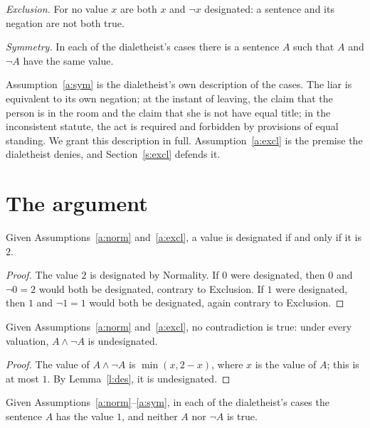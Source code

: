 \documentclass{situationist-preprint}
\begin{document}
\begin{assumption}\label{a:excl}
\emph{Exclusion.} For no value $x$ are both $x$ and $\neg x$ designated: a sentence and its negation are not both true.
\end{assumption}

\begin{assumption}\label{a:sym}
\emph{Symmetry.} In each of the dialetheist's cases there is a sentence $A$ such that $A$ and $\neg A$ have the same value.
\end{assumption}

Assumption~\ref{a:sym} is the dialetheist's own description of the cases. The liar is equivalent to its own negation; at the instant of leaving, the claim that the person is in the room and the claim that she is not have equal title; in the inconsistent statute, the act is required and forbidden by provisions of equal standing. We grant this description in full. Assumption~\ref{a:excl} is the premise the dialetheist denies, and Section~\ref{s:excl} defends it.

\section{The argument}

\begin{lemma}\label{l:des}
Given Assumptions~\ref{a:norm} and~\ref{a:excl}, a value is designated if and only if it is $2$.
\end{lemma}

\begin{proof}
The value $2$ is designated by Normality. If $0$ were designated, then $0$ and $\neg 0 = 2$ would both be designated, contrary to Exclusion. If $1$ were designated, then $1$ and $\neg 1 = 1$ would both be designated, again contrary to Exclusion.
\end{proof}

\begin{theorem}\label{t:nocontra}
Given Assumptions~\ref{a:norm} and~\ref{a:excl}, no contradiction is true: under every valuation, $A \wedge \neg A$ is undesignated.
\end{theorem}

\begin{proof}
The value of $A \wedge \neg A$ is $\min(x, 2-x)$, where $x$ is the value of $A$; this is at most $1$. By Lemma~\ref{l:des}, it is undesignated.
\end{proof}

\begin{theorem}\label{t:gaps}
Given Assumptions~\ref{a:norm}--\ref{a:sym}, in each of the dialetheist's cases the sentence $A$ has the value $1$, and neither $A$ nor $\neg A$ is true.
\end{theorem}
\end{document}
